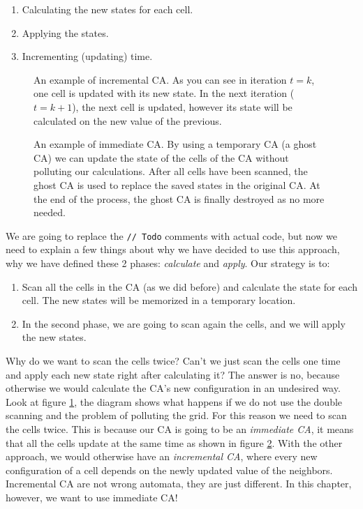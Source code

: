 \begin{enumerate}
\item Calculating the new states for each cell.
\item Applying the states.
\item Incrementing (updating) time.
\end{enumerate}

%
\begin{figure}[b]
\sidecaption

%
%
\caption{An example of incremental CA. As you can see in iteration $t=k$, one cell is updated
with its new state. In the next iteration ($t=k+1$), the next cell is updated, however its state
will be calculated on the new value of the previous.}
\label{fig:updatecainc}
\end{figure}
%

%
\begin{figure}[b]
\sidecaption

%
%
\caption{An example of immediate CA. By using a temporary CA (a ghost CA) we can update
the state of the cells of the CA without polluting our calculations. After all cells have been scanned, the
ghost CA is used to replace the saved states in the original CA. At the end of the process, the ghost CA is
finally destroyed as no more needed.}
\label{fig:updatecaimm}
\end{figure}
%

We are going to replace the \texttt{// Todo} comments with actual code, but now we need to explain a few
things about why we have decided to use this approach, why we have defined these 2 phases: 
\textit{calculate} and \textit{apply}. Our strategy is to:

\begin{enumerate}
\item Scan all the cells in the CA (as we did before) and calculate the state for each cell.
The new states will be memorized in a temporary location.
\item In the second phase, we are going to scan again the cells, and we will apply the new states.
\end{enumerate}

Why do we want to scan the cells twice? Can't we just scan the cells one time and apply each new state
right after calculating it? The answer is no, because otherwise we would calculate the CA's new configuration
in an undesired way. Look at figure \ref{fig:updatecainc},
the diagram shows what happens if we do not use the double
scanning and the problem of polluting the grid. For this reason we need to scan the cells twice. This is because
our CA is going to be an \textit{immediate CA}, it means that all the cells update at the same time
as shown in figure \ref{fig:updatecaimm}.
With the other
approach, we would otherwise have an \textit{incremental CA}, where every new configuration of a cell depends on the
newly updated value of the neighbors. Incremental CA are not wrong automata,
they are just different. In this chapter,
however, we want to use immediate CA!

